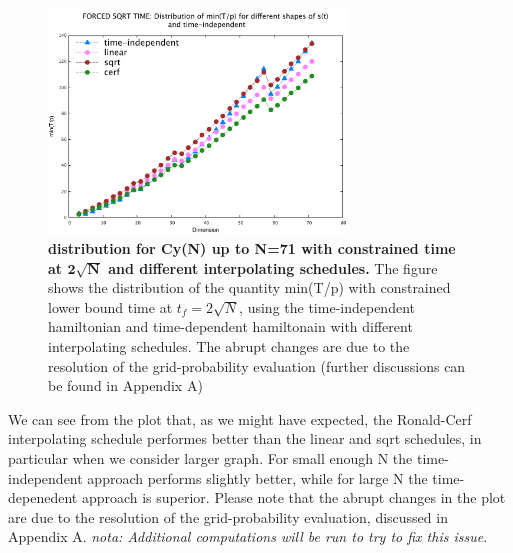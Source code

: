         \begin{figure}[!h]
        \centering
        \includegraphics[width=80mm]{./figures/min_tp_sqrt/forced_sqrt_delta.pdf}
        \caption[$\min(t_f/P)$ distribution for Cy(N) up to N=71 with constrained time at $\sqrt(N)$ and different interpolating schedules.]{\textbf{ distribution for Cy(N) up to N=71 with constrained time at $\bm{2\sqrt{N}}$ and different interpolating schedules.} The figure shows the distribution of the quantity min(T/p) with constrained lower bound time at $t_f= 2\sqrt{N}$, using the time-independent hamiltonian and time-dependent hamiltonain with different interpolating schedules. The abrupt changes are due to the resolution of the grid-probability evaluation (further discussions can be found in Appendix A)}
        \label{fig:delta_complete_sqrt}
        \end{figure}

        \noindent
        We can see from the plot that, as we might have expected, the Ronald-Cerf interpolating schedule performes better than the linear and sqrt schedules, in particular when we consider larger graph. For small enough N the time-independent approach performs slightly better, while for large N the time-depenedent approach is superior. Please note that the abrupt changes in the plot are due to the resolution of the grid-probability evaluation, discussed in Appendix A. \textit{nota: Additional computations will be run to try to fix this issue}.



